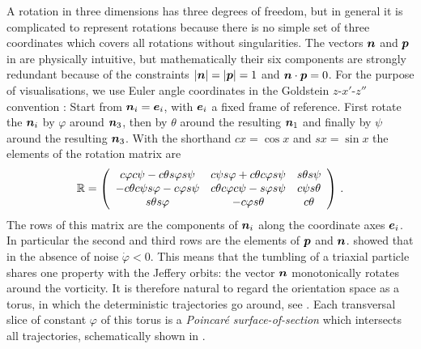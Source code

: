 \documentclass[thesis.tex]{subfiles}
\begin{document}
A rotation in three dimensions has three degrees of freedom, but in general it is complicated to represent rotations because there is no simple set of three coordinates which covers all rotations without singularities. The vectors $\mbox{\boldmath$n$}$ and $\mbox{\boldmath$p$}$ in  are physically intuitive, but mathematically their six components are strongly redundant because of the constraints $|\mbox{\boldmath$n$}|=|\mbox{\boldmath$p$}|=1$ and $\mbox{\boldmath$n$}\cdot\mbox{\boldmath$p$}=0$.
For the purpose of visualisations, we use Euler angle coordinates in the Goldstein $z$-$x'$-$z''$ convention \cite{goldstein}: Start from $\mbox{\boldmath$n$}_i = \mbox{\boldmath$e$}_i$, with $\mbox{\boldmath$e$}_i$ a fixed frame of reference. First rotate the $\mbox{\boldmath$n$}_i$ by $\varphi$ around $\mbox{\boldmath$n$}_3$, then by $\theta$ around the resulting $\mbox{\boldmath$n$}_1$ and finally by $\psi$ around the resulting $\mbox{\boldmath$n$}_3$. With the shorthand $cx=\cos x$ and $sx=\sin x$ the elements of the rotation matrix are
\begin{align}
	\mathbb{R}=\left(
\begin{array}{ccc}
 c\varphi c\psi-c\theta s\varphi s\psi & c\psi s\varphi+c\theta c\varphi s\psi & s\theta s\psi \\
 -c\theta c\psi s\varphi-c\varphi s\psi & c\theta c\varphi c\psi-s\varphi s\psi & c\psi s\theta \\
 s\theta s\varphi & -c\varphi s\theta & c\theta \\
\end{array}
\right)\,.
\end{align}
The rows of this matrix are the components of $\mbox{\boldmath$n$}_i$ along the coordinate axes $\mbox{\boldmath$e$}_i$. In particular the second and third rows are the elements of $\mbox{\boldmath$p$}$ and $\mbox{\boldmath$n$}$.
\citet{hinch1979} showed that in the absence of noise $\dot \varphi < 0$. This means that the tumbling of a triaxial particle shares one property with the Jeffery orbits: the vector $\mbox{\boldmath$n$}$ monotonically rotates around the vorticity. It is therefore natural to regard the orientation space as a torus, in which the deterministic trajectories go around, see . Each transversal slice of constant $\varphi$ of this torus is a \emph{Poincar\'e surface-of-section} \cite{Strogatz} which intersects all trajectories, schematically shown in .
\end{document}
